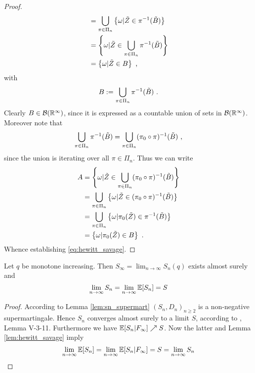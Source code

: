 \begin{lemma}
\begin{proof}
\begin{align*}
		&=  \bigcup\limits_{\pi\in\Pi_n} \left\{\omega | \tilde{Z} \in \pi^{-1}(\tilde{B})\right\}\\
		&=  \left\{\omega | \tilde{Z} \in \bigcup\limits_{\pi\in\Pi_n}\pi^{-1}(\tilde{B})\right\}\\
		&= \left\{\omega | \tilde{Z} \in B\right\}\textrm{ ,}
		\end{align*}		
		with 
		$$B:=\bigcup\limits_{\pi\in\Pi_n}\pi^{-1}(\tilde{B})\textrm{ .}$$
		Clearly $B\in\mathcal{B}(\mathbb{R}^\infty)$, since it is expressed as a countable union of sets in $\mathcal{B}(\mathbb{R}^\infty)$.
		Moreover note that 
		$$\bigcup\limits_{\pi\in\Pi_n}\pi^{-1}(\tilde{B}) = \bigcup\limits_{\pi\in\Pi_n}(\pi_0\circ\pi)^{-1}(\tilde{B})\textrm{ ,}$$
		since the union is iterating over all $\pi\in\Pi_n$. Thus we can write
		\begin{align*}
		A &= \left\{\omega | \tilde{Z} \in \bigcup\limits_{\pi\in\Pi_n}(\pi_0\circ\pi)^{-1}(\tilde{B})\right\}\\
		&= \bigcup\limits_{\pi\in\Pi_n}\left\{\omega | \tilde{Z} \in (\pi_0\circ\pi)^{-1}(\tilde{B})\right\}\\
		&= \bigcup\limits_{\pi\in\Pi_n}\left\{\omega | \pi_0(\tilde{Z}) \in \pi^{-1}(\tilde{B})\right\}\\
		&= \left\{\omega | \pi_0(\tilde{Z}) \in B\right\}\textrm{ .}
		\end{align*}		
		Whence establishing \eqref{eq:hewitt_savage}.
	\end{proof}
\end{lemma}
%
\begin{thm}\label{thm:ex_limit_sn}
	Let $q$ be monotone increasing. Then $S_\infty = \lim_{n\to\infty} S_n(q)$ exists almost surely and 
	$$\lim\limits_{n\to\infty} S_n = \lim\limits_{n\to\infty} \mathbb{E}[S_n] = S$$
	\begin{proof}
		According to Lemma \ref{lem:sn_supermart} $(S_n,D_n)_{n\geq 2}$ is a non-negative supermartingale. Hence $S_n$ converges almost surely to a limit $S$, according to \cite{neveu1975discrete}, Lemma V-3-11. Furthermore we have $\mathbb{E}[S_n|F_\infty] \nearrow S$. Now the latter and Lemma \ref{lem:hewitt_savage} imply
		$$\lim\limits_{n\to\infty}\mathbb{E}[S_n] = \lim\limits_{n\to\infty}\mathbb{E}[S_n|F_\infty] = S = \lim\limits_{n\to\infty}S_n$$		
	\end{proof}
\end{thm}
%